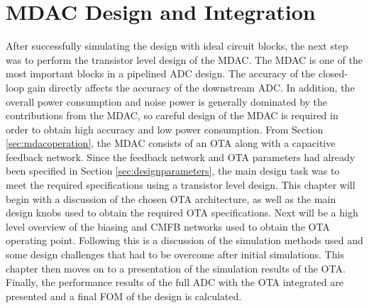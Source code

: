 \chapter{MDAC Design and Integration}
After successfully simulating the design with ideal circuit blocks, the next step was to perform the transistor level design of the MDAC. The MDAC is one of the most important blocks in a pipelined ADC design. The accuracy of the closed-loop gain directly affects the accuracy of the downstream ADC. In addition, the overall power consumption and noise power is generally dominated by the contributions from the MDAC, so careful design of the MDAC is required in order to obtain high accuracy and low power consumption. From Section \ref{sec:mdacoperation}, the MDAC consists of an OTA along with a capacitive feedback network. Since the feedback network and OTA parameters had already been specified in Section \ref{sec:designparameters}, the main design task was to meet the required specifications using a transistor level design. This chapter will begin with a discussion of the chosen OTA architecture, as well as the main design knobs used to obtain the required OTA specifications. Next will be a high level overview of the biasing and CMFB networks used to obtain the OTA operating point. Following this is a discussion of the simulation methods used and some design challenges that had to be overcome after initial simulations. This chapter then moves on to a presentation of the simulation results of the OTA. Finally, the performance results of the full ADC with the OTA integrated are presented and a final FOM of the design is calculated.
